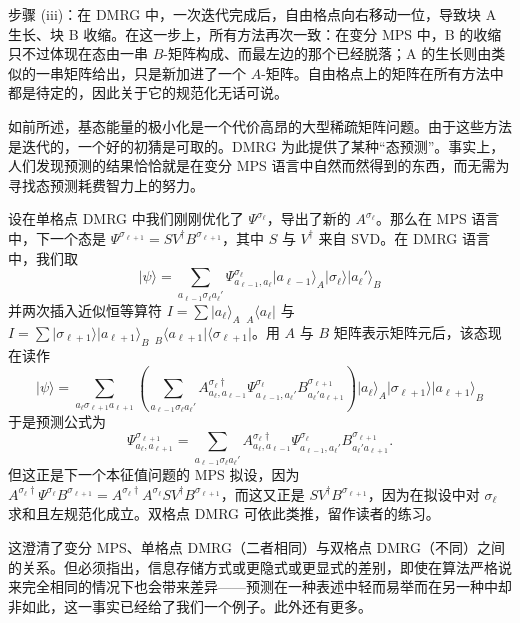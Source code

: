 \documentclass[a4paper,10pt,oneside,onecolumn,1p,times]{elsarticle}
\newcommand{\bra}[1]{\mbox{$\langle #1  |$}}
\newcommand{\ket}[1]{\mbox{$| #1  \rangle$}}
\begin{document}
步骤 (iii)：在 DMRG 中，一次迭代完成后，自由格点向右移动一位，导致块 A 生长、块 B 收缩。在这一步上，所有方法再次一致：在变分 MPS 中，B 的收缩只不过体现在态由一串 $B$-矩阵构成、而最左边的那个已经脱落；A 的生长则由类似的一串矩阵给出，只是新加进了一个 $A$-矩阵。自由格点上的矩阵在所有方法中都是待定的，因此关于它的规范化无话可说。

如前所述，基态能量的极小化是一个代价高昂的大型稀疏矩阵问题。由于这些方法是迭代的，一个好的初猜是可取的。DMRG 为此提供了某种``态预测''\cite{White96}。事实上，人们发现预测的结果恰恰就是在变分 MPS 语言中自然而然得到的东西，而无需为寻找态预测耗费智力上的努力。

设在单格点 DMRG 中我们刚刚优化了 $\Psi^{\sigma_\ell}$，导出了新的 $A^{\sigma_ \ell}$。那么在 MPS 语言中，下一个态是 $\Psi^{\sigma_{\ell +1}}= SV^{\dagger} B^{\sigma_{\ell +1}}$，其中 $S$ 与 $V^\dagger$ 来自 SVD。在 DMRG 语言中，我们取
\begin{equation}
\ket{\psi} = \sum_{a_{\ell-1}\sigma_ \ell a_{\ell }'} \Psi^{\sigma_ \ell}_{a_{\ell-1}, a_{\ell }} \ket{a_{\ell-1}}_A \ket{\sigma_ \ell} \ket{a_{\ell}'}_B
\end{equation}
并两次插入近似恒等算符 $I= \sum \ket{a_ \ell}_A\phantom\langle_A\bra{a_ \ell}$ 与
$I= \sum \ket{\sigma_{\ell +1}}\ket{a_{\ell+1}}_B \phantom\langle_B\bra{a_{\ell +1}} \bra{\sigma_{\ell+1}}$。用 $A$ 与 $B$ 矩阵表示矩阵元后，该态现在读作
\begin{equation}
\ket{\psi} = \sum_{a_\ell\sigma_{\ell +1} a_{\ell +1}} \left( \sum_{a_{\ell-1}\sigma_ \ell  a_{\ell}'} 
A^{\sigma_ \ell \dagger}_{a_ \ell,a_{\ell-1}} \Psi^{\sigma_ \ell}_{a_{\ell-1}, a_{\ell}'}  B^{\sigma_{\ell +1}}_{a_{\ell}' a_{\ell +1}} \right) 
\ket{a_{\ell}}_A \ket{\sigma_{\ell +1}} \ket{a_{\ell +1}}_B
\end{equation}
于是预测公式为
\begin{equation}
\Psi^{\sigma_{\ell +1}}_{a_{\ell}, a_{\ell+1}} = 
\sum_{a_{\ell-1}\sigma_ \ell a_{\ell}'} 
A^{\sigma_ \ell \dagger}_{a_ \ell,a_{\ell-1}} \Psi^{\sigma_ \ell}_{a_{\ell-1}, a_{\ell}'}  B^{\sigma_{\ell +1}}_{a_{\ell}' a_{\ell +1}} .
\end{equation}
但这正是下一个本征值问题的 MPS 拟设，因为 $ A^{\sigma_ \ell \dagger} \Psi^{\sigma_ \ell}  B^{\sigma_{\ell +1}} =
A^{\sigma_ \ell \dagger} A^{\sigma_ \ell } S V^{\dagger} B^{\sigma_{\ell +1}}$，而这又正是
$S V^{\dagger} B^{\sigma_{\ell +1}}$，因为在拟设中对 $\sigma_ \ell $ 求和且左规范化成立。双格点 DMRG 可依此类推，留作读者的练习。

这澄清了变分 MPS、单格点 DMRG（二者相同）与双格点 DMRG（不同）之间的关系。但必须指出，信息存储方式或更隐式或更显式的差别，即使在算法严格说来完全相同的情况下也会带来差异——预测在一种表述中轻而易举而在另一种中却非如此，这一事实已经给了我们一个例子。此外还有更多。
\end{document}
